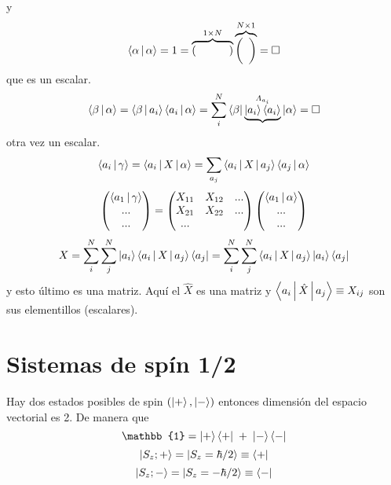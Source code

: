 \documentclass[10pt,oneside]{CBFT_book}
\begin{document}
y 
\[
	\Braket{\alpha|\alpha} = 1 = \overbrace{( \phantom{1} \qquad \phantom{1} )}^{1\times 
N}\overbrace{\begin{pmatrix} \phantom{1} \\ 	\phantom{1}  \end{pmatrix} }^{N\times 1} = \Box
\]
que es un escalar.
\[
	\Braket{\beta|\alpha} = \Braket{\beta|a_i} \Braket{a_i|\alpha} = 
	\sum_i^N \Bra{\beta} \underbrace{\Ket{a_i} \Braket{a_i}}^{\Lambda_{a_i}} \Ket{\alpha} = \Box 
\]
otra vez un escalar.
\[
	\Braket{a_i|\gamma} = \Braket{a_i|X|\alpha} = \sum_{a_j} \Braket{a_i|X|a_j}\Braket{a_j|\alpha}
\]
\[
	\begin{pmatrix}
	 \Braket{a_1|\gamma} \\
	 ... \\
	 ... \\
	\end{pmatrix} = 
	\begin{pmatrix}
	 X_{11} & X_{12} & ...\\
	 X_{21} & X_{22} & ... \\
	 ... \\
	\end{pmatrix}
	\begin{pmatrix}
	 \Braket{a_1|\alpha} \\
	 ... \\
	 ... \\	 
	\end{pmatrix}
\]
\[
	X = \sum_i^N \sum_j^N \Ket{a_i} \Braket{a_i|X|a_j} \Bra{a_j} =
		\sum_i^N \sum_j^N  \Braket{a_i|X|a_j} \Ket{a_i} \Bra{a_j}
\]
y esto último es una matriz. Aquí el $\hat{X}$ es una matriz y $\Braket{a_i|\hat{X}|a_j} \equiv X_{ij}$ son 
sus elementillos (escalares).

\section{Sistemas de spín 1/2}

Hay dos estados posibles de spin $(\Ket{+}, \Ket{-})$ entonces dimensión del espacio vectorial es 2. De 
manera que 
\[
	\mathbb{1} = \Ket{+}\Bra{+} \; + \;  \Ket{-}\Bra{-}
\]
\[
	\Ket{S_z ; +} = \Ket{S_z = \hbar/2} \equiv \Bra{+} 
\]
\[
	\Ket{S_z ; -} = \Ket{S_z = -\hbar/2} \equiv \Bra{-}
\]
\end{document}
